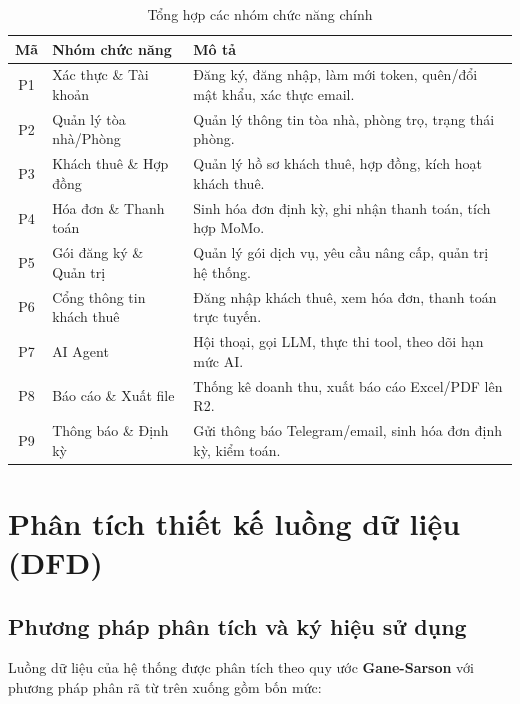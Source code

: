 \documentclass[12pt,a4paper]{report}
\begin{document}
\begin{table}[H]
  \centering
  \caption{Tổng hợp các nhóm chức năng chính}
  \begin{tabular}{@{}c p{4.2cm} p{9cm}@{}}
    \toprule
    \textbf{Mã} & \textbf{Nhóm chức năng} & \textbf{Mô tả} \\
    \midrule
    P1 & Xác thực \& Tài khoản & Đăng ký, đăng nhập, làm mới token, quên/đổi mật khẩu, xác thực email. \\
    \addlinespace
    P2 & Quản lý tòa nhà/Phòng & Quản lý thông tin tòa nhà, phòng trọ, trạng thái phòng. \\
    \addlinespace
    P3 & Khách thuê \& Hợp đồng & Quản lý hồ sơ khách thuê, hợp đồng, kích hoạt khách thuê. \\
    \addlinespace
    P4 & Hóa đơn \& Thanh toán & Sinh hóa đơn định kỳ, ghi nhận thanh toán, tích hợp MoMo. \\
    \addlinespace
    P5 & Gói đăng ký \& Quản trị & Quản lý gói dịch vụ, yêu cầu nâng cấp, quản trị hệ thống. \\
    \addlinespace
    P6 & Cổng thông tin khách thuê & Đăng nhập khách thuê, xem hóa đơn, thanh toán trực tuyến. \\
    \addlinespace
    P7 & AI Agent & Hội thoại, gọi LLM, thực thi tool, theo dõi hạn mức AI. \\
    \addlinespace
    P8 & Báo cáo \& Xuất file & Thống kê doanh thu, xuất báo cáo Excel/PDF lên R2. \\
    \addlinespace
    P9 & Thông báo \& Định kỳ & Gửi thông báo Telegram/email, sinh hóa đơn định kỳ, kiểm toán. \\
    \bottomrule
  \end{tabular}
\end{table}

\chapter{Phân tích thiết kế luồng dữ liệu (DFD)}

\section{Phương pháp phân tích và ký hiệu sử dụng}

Luồng dữ liệu của hệ thống được phân tích theo quy ước \textbf{Gane-Sarson} với phương pháp phân rã từ trên xuống gồm bốn mức:
\end{document}

